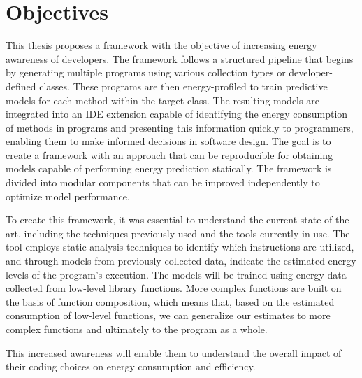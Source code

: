 \section{Objectives}

This thesis proposes a framework with the objective of increasing energy awareness of developers. The framework follows a structured pipeline that begins by generating multiple programs using various collection types or developer-defined classes. These programs are then energy-profiled to train predictive models for each method within the target class.
The resulting models are integrated into an IDE extension capable of identifying the energy consumption of methods in programs and presenting this information quickly to programmers, enabling them to make informed decisions in software design. The goal is to create a framework with an approach that can be reproducible for obtaining models capable of performing energy prediction statically. The framework is divided into modular components that can be improved independently to optimize model performance.

To create this framework, it was essential to understand the current state of the art, including the techniques previously used and the tools currently in use. The tool employs static analysis techniques to identify which instructions are utilized, and through models from previously collected data, indicate the estimated energy levels of the program's execution. The models will be trained using energy data collected from low-level library functions. More complex functions are built on the basis of function composition, which means that, based on the estimated consumption of low-level functions, we can generalize our estimates to more complex functions and ultimately to the program as a whole. 

This increased awareness will enable them to understand the overall impact of their coding choices on energy consumption and efficiency.



